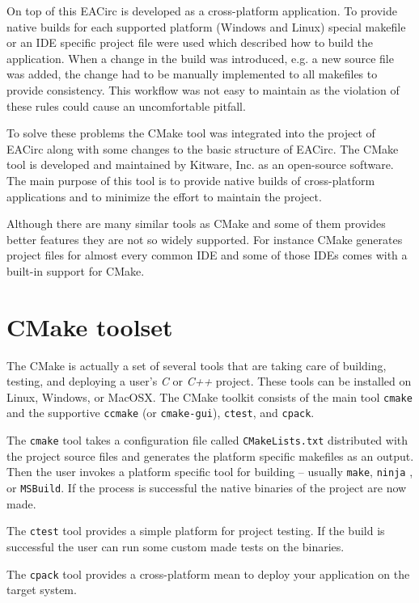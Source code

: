 \documentclass[12pt,oneside]{fithesis2}
\begin{document}
On top of this EACirc is developed as a cross-platform application. To provide native builds for each supported platform (Windows \cite{win} and Linux) special makefile or an IDE specific project file were used which described how to build the application. When a change in the build was introduced, e.g. a new source file was added, the change had to be manually implemented to all makefiles to provide consistency. This workflow was not easy to maintain as the violation of these rules could cause an uncomfortable pitfall.

To solve these problems the CMake \cite{cmake} tool was integrated into the project of EACirc along with some changes to the basic structure of EACirc. The CMake tool is developed and maintained by Kitware, Inc. \cite{kitware} as an open-source software. The main purpose of this tool is to provide native builds of cross-platform applications and to minimize the effort to maintain the project.

Although there are many similar tools as CMake and some of them provides better features they are not so widely supported. For instance CMake generates project files for almost every common IDE and some of those IDEs comes with a built-in support for CMake.

\section{CMake toolset}

The CMake is actually a set of several tools that are taking care of building, testing, and deploying a user's \emph{C} or \emph{C++} project. These tools can be installed on Linux, Windows, or MacOSX. The CMake toolkit consists of the main tool \texttt{cmake} and the supportive \texttt{ccmake} (or \texttt{cmake-gui}), \texttt{ctest}, and \texttt{cpack}.

The \texttt{cmake} tool takes a configuration file called \texttt{CMakeLists.txt} distributed with the project source files and generates the platform specific makefiles as an output. Then the user invokes a platform specific tool for building -- usually \texttt{make}, \texttt{ninja} \cite{ninja}, or \texttt{MSBuild}. \cite{msbuild} If the process is successful the native binaries of the project are now made.

The \texttt{ctest} tool provides a simple platform for project testing. If the build is successful the user can run some custom made tests on the binaries.

The \texttt{cpack} tool provides a cross-platform mean to deploy your application on the target system.
\end{document}
